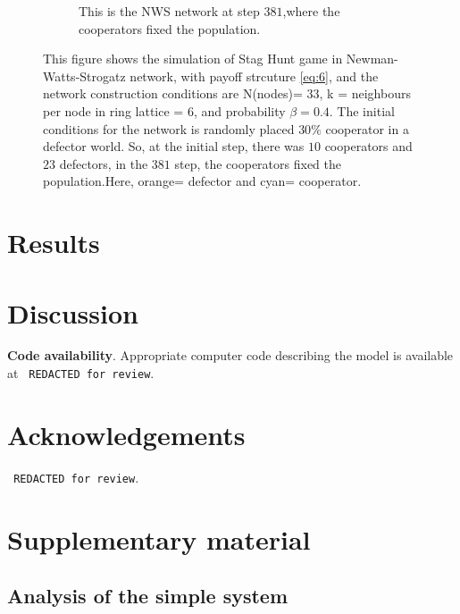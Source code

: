\documentclass{article}
\begin{document}
\begin{figure}[ht]
\begin{subfigure}[b]{0.45\textwidth}
    \caption{This is the NWS network at step $381$,where the cooperators fixed the population.}
    \label{fig:fig2}
  \end{subfigure}
  \caption{This figure shows the simulation of Stag Hunt game in Newman-Watts-Strogatz network, with payoff strcuture \eqref{eq:6}, and the network construction conditions are N(nodes)= $33$, k = neighbours per node in ring lattice = $6$, and probability $\beta = 0.4$. The initial conditions for the network is randomly placed $30\%$ cooperator in a defector world. So, at the initial step, there was $10$ cooperators and $23$ defectors, in the $381$ step, the cooperators fixed the population.Here, orange= defector and cyan= cooperator.}
  \label{fig:side_by_side}
\end{figure}







\section{Results}
\section{Discussion}





\textbf{Code availability}.
Appropriate computer code describing the model is available at 
\texttt{ REDACTED for review}.%

\section{Acknowledgements}
\texttt{ REDACTED for review}.%





\renewcommand{\theequation}{SI.\arabic{equation}}
\setcounter{equation}{0}

\renewcommand{\thefigure}{SI.\arabic{figure}}
\setcounter{figure}{0}

\section{Supplementary material}


\subsection{Analysis of the simple system}
\end{document}
